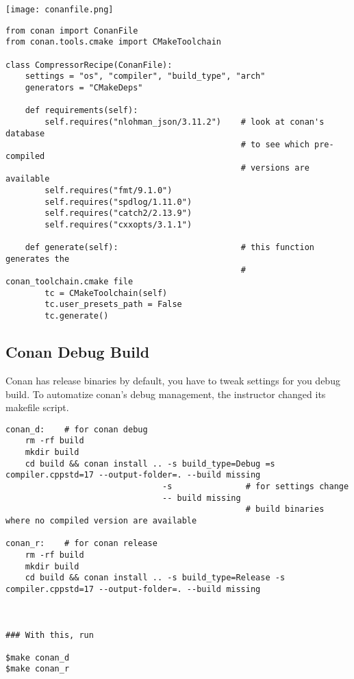 \documentclass[openany]{report}
\begin{document}
\begin{center}
    \texttt{[image: conanfile.png]}
\end{center}

\begin{verbatim}
from conan import ConanFile
from conan.tools.cmake import CMakeToolchain

class CompressorRecipe(ConanFile):
    settings = "os", "compiler", "build_type", "arch"
    generators = "CMakeDeps"

    def requirements(self):
        self.requires("nlohman_json/3.11.2")    # look at conan's database
                                                # to see which pre-compiled
                                                # versions are available
        self.requires("fmt/9.1.0")
        self.requires("spdlog/1.11.0")
        self.requires("catch2/2.13.9")
        self.requires("cxxopts/3.1.1")

    def generate(self):                         # this function generates the
                                                # conan_toolchain.cmake file
        tc = CMakeToolchain(self)
        tc.user_presets_path = False
        tc.generate()
\end{verbatim}

\subsection{Conan Debug Build}

Conan has release binaries by default, you have to tweak settings for you debug build.
To automatize conan's debug management, the instructor changed its makefile script.


\begin{verbatim}
conan_d:    # for conan debug
    rm -rf build
    mkdir build
    cd build && conan install .. -s build_type=Debug =s compiler.cppstd=17 --output-folder=. --build missing
                                -s               # for settings change
                                -- build missing 
                                                 # build binaries where no compiled version are available

conan_r:    # for conan release
    rm -rf build
    mkdir build
    cd build && conan install .. -s build_type=Release -s compiler.cppstd=17 --output-folder=. --build missing



### With this, run

$make conan_d
$make conan_r
\end{verbatim}  
\end{document}
